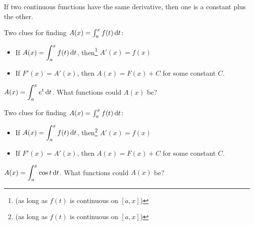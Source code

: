 \begin{frame}[t]
\vfill
If two continuous functions have the same derivative, then one is a constant plus the other.
\end{frame}
\begin{frame}[t]
Two clues for finding $A(x)=\int_a^x f(t) \, \text{d} t$:
\begin{itemize}
\item If $\displaystyle A(x)=\int_a^x f(t)\, \text{d} t$, then\footnote{(as long as $f(t)$ is continuous on $[a,x]$)}  $A'(x)=f(x)$
\item If $F'(x)=A'(x)$, then $A(x)=F(x)+C$ for some constant $C$.
\end{itemize}
\pause\vspace{1em}

$A(x)\displaystyle = \int_a^x e^t\, \text{d} t$. What functions could $A(x)$ be?\vfill
{}
\end{frame}
\addtocounter{footnote}{-1}
\begin{frame}[t]

Two clues for finding $A(x)=\int_a^x f(t) \, \text{d} t$:
\begin{itemize}
\item If $\displaystyle A(x)=\int_a^x f(t)\, \text{d} t$, then\footnote{(as long as $f(t)$ is continuous on $[a,x]$)}  $A'(x)=f(x)$
\item If $F'(x)=A'(x)$, then $A(x)=F(x)+C$ for some constant $C$.
\end{itemize}
\vspace{1em}

$A(x)\displaystyle = \int_a^x \cos t\, \text{d} t$. What functions could $A(x)$ be?\vfill
{}
\end{frame}
